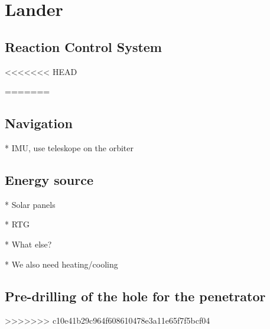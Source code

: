 \chapter{Lander}





\section{Reaction Control System}

<<<<<<< HEAD

=======
\section{Navigation}

* IMU, use teleskope on the orbiter

\section{Energy source}

* Solar panels

* RTG

* What else?

* We also need heating/cooling

\section{Pre-drilling of the hole for the penetrator}
>>>>>>> c10e41b29c964f608610478e3a11e65f7f5bcf04
